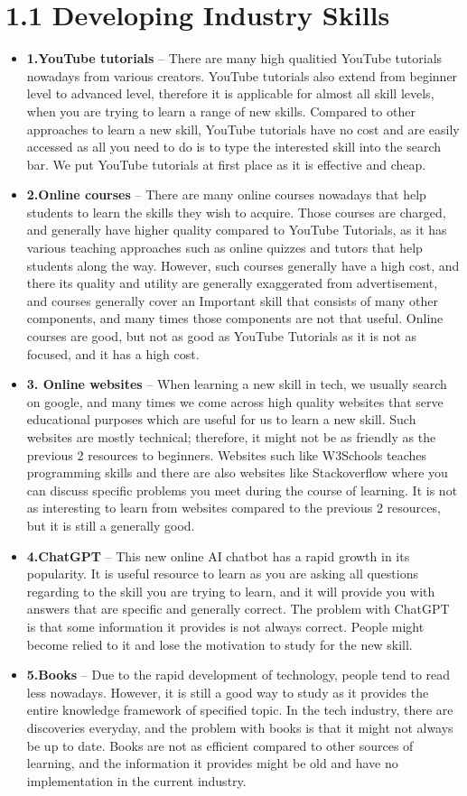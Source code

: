 \documentclass[a4paper, 11pt]{report}
\begin{document}
\section{1.1 Developing Industry Skills}
\begin{itemize}
\item \textbf{1.YouTube tutorials} – There are many high qualitied YouTube tutorials nowadays from various creators. YouTube tutorials also extend from beginner level to advanced level, therefore it is applicable for almost all skill levels, when you are trying to learn a range of new skills. Compared to other approaches to learn a new skill, YouTube tutorials have no cost and are easily accessed as all you need to do is to type the interested skill into the search bar. We put YouTube tutorials at first place as it is effective and cheap.
\item \textbf{2.Online courses} – There are many online courses nowadays that help students to learn the skills they wish to acquire. Those courses are charged, and generally have higher quality compared to YouTube Tutorials, as it has various teaching approaches such as online quizzes and tutors that help students along the way. However, such courses generally have a high cost, and there its quality and utility are generally exaggerated from advertisement, and courses generally cover an Important skill that consists of many other components, and many times those components are not that useful. Online courses are good, but not as good as YouTube Tutorials as it is not as focused, and it has a high cost.
\item \textbf{3. Online websites} – When learning a new skill in tech, we usually search on google, and many times we come across high quality websites that serve educational purposes which are useful for us to learn a new skill. Such websites are mostly technical; therefore, it might not be as friendly as the previous 2 resources to beginners. Websites such like W3Schools teaches programming skills and there are also websites like Stackoverflow where you can discuss specific problems you meet during the course of learning. It is not as interesting to learn from websites compared to the previous 2 resources, but it is still a generally good.
\item \textbf{4.ChatGPT} – This new online AI chatbot has a rapid growth in its popularity. It is useful resource to learn as you are asking all questions regarding to the skill you are trying to learn, and it will provide you with answers that are specific and generally correct. The problem with ChatGPT is that some information it provides is not always correct. People might become relied to it and lose the motivation to study for the new skill.
\item \textbf{5.Books} – Due to the rapid development of technology, people tend to read less nowadays. However, it is still a good way to study as it provides the entire knowledge framework of specified topic. In the tech industry, there are discoveries everyday, and the problem with books is that it might not always be up to date. Books are not as efficient compared to other sources of learning, and the information it provides might be old and have no implementation in the current industry.


\end{itemize}
\end{document}
